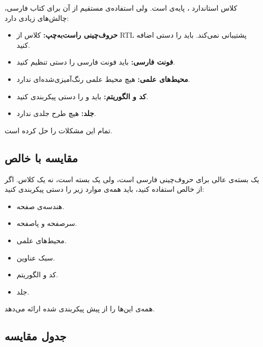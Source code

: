 کلاس  استاندارد ، پایه‌ی
 است. ولی استفاده‌ی مستقیم از
آن برای کتاب فارسی، چالش‌های زیادی دارد:

\begin{itemize}
    \item \textbf{حروف‌چینی راست‌به‌چپ:} کلاس
     از RTL پشتیبانی نمی‌کند. باید
     را دستی اضافه کنید.

    \item \textbf{فونت فارسی:} باید فونت فارسی
    را دستی تنظیم کنید.

    \item \textbf{محیط‌های علمی:} هیچ محیط علمی
    رنگ‌آمیزی‌شده‌ای ندارد.

    \item \textbf{کد و الگوریتم:} باید 
    و  را دستی پیکربندی کنید.

    \item \textbf{جلد:} هیچ طرح جلدی ندارد.
\end{itemize}

 تمام این مشکلات را حل کرده است.

\subsection{مقایسه با  خالص}
\label{sec:introduction-vs-xepersian}

 یک بسته‌ی عالی برای حروف‌چینی
فارسی است، ولی یک بسته است، نه یک کلاس. اگر
از  خالص استفاده کنید، باید
همه‌ی موارد زیر را دستی پیکربندی کنید:

\begin{itemize}
    \item هندسه‌ی صفحه.
    \item سرصفحه و پاصفحه.
    \item محیط‌های علمی.
    \item سبک عناوین.
    \item کد و الگوریتم.
    \item جلد.
\end{itemize}


 همه‌ی این‌ها را از پیش پیکربندی
شده ارائه می‌دهد.

\subsection{جدول مقایسه}
\label{sec:introduction-comparison-table}

